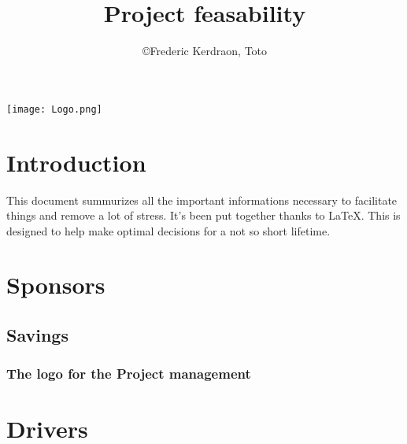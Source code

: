 \documentclass[8pt]{article} %
\title{Project feasability}
\author{\copyright Frederic Kerdraon, Toto}
\begin{document}
\maketitle
\hspace*{-1cm}\texttt{[image: Logo.png]}
\tableofcontents

\section{Introduction}

This document summurizes all the important informations necessary to facilitate things and remove a lot of stress. It's been put together thanks to \LaTeX. This is designed to help make optimal decisions for a not so short lifetime.

%


\newcommand{\slice}[4]{
  \pgfmathparse{0.5*#1+0.5*#2}
  \let\midangle\pgfmathresult

   slice
  \draw[thick,fill=black!10] (0,0) -- (#1:1) arc (#1:#2:1) -- cycle;

   outer label
  \node[label=\midangle:#4] at (\midangle:1) {};

   inner label
  \pgfmathparse{min((#2-#1-10)/110*(-0.3),0)}
  \let\temp\pgfmathresult
  \pgfmathparse{max(\temp,-0.5) + 0.8}
  \let\innerpos\pgfmathresult
  \node at (\midangle:\innerpos) {#3};
}

\section{Sponsors}

\subsection{Savings}
\subsubsection{The logo for the Project management}


\section{Drivers}
\end{document}
